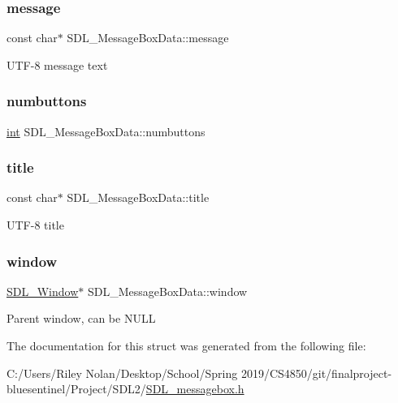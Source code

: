 \subsubsection{\texorpdfstring{message}{message}}
{\footnotesize\ttfamily const char$\ast$ S\+D\+L\+\_\+\+Message\+Box\+Data\+::message}

U\+T\+F-\/8 message text \mbox{\label{struct_s_d_l___message_box_data_a133f4fef549cc0cb14b799af35f3dc5a}} 
\subsubsection{\texorpdfstring{numbuttons}{numbuttons}}
{\footnotesize\ttfamily \mbox{\hyperlink{warnings_8h_a74f207b5aa4ba51c3a2ad59b219a423b}{int}} S\+D\+L\+\_\+\+Message\+Box\+Data\+::numbuttons}

\mbox{\label{struct_s_d_l___message_box_data_a93ceeafeed20b553ad4c86c9be37f117}} 
\subsubsection{\texorpdfstring{title}{title}}
{\footnotesize\ttfamily const char$\ast$ S\+D\+L\+\_\+\+Message\+Box\+Data\+::title}

U\+T\+F-\/8 title \mbox{\label{struct_s_d_l___message_box_data_a5c333bc93705c66068e140bc28daedcb}} 
\subsubsection{\texorpdfstring{window}{window}}
{\footnotesize\ttfamily \mbox{\hyperlink{_s_d_l__video_8h_a55a196c7d3b8497538632c79ae1e6392}{S\+D\+L\+\_\+\+Window}}$\ast$ S\+D\+L\+\_\+\+Message\+Box\+Data\+::window}

Parent window, can be N\+U\+LL 

The documentation for this struct was generated from the following file\+:\begin{DoxyCompactItemize}
\item 
C\+:/\+Users/\+Riley Nolan/\+Desktop/\+School/\+Spring 2019/\+C\+S4850/git/finalproject-\/bluesentinel/\+Project/\+S\+D\+L2/\mbox{\hyperlink{_s_d_l__messagebox_8h}{S\+D\+L\+\_\+messagebox.\+h}}\end{DoxyCompactItemize}
